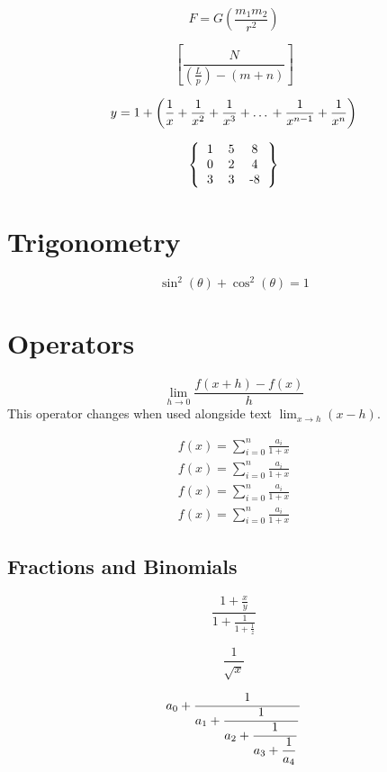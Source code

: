\documentclass[]{article}
\begin{document}
\[ 
F = G \left( \frac{m_1 m_2}{r^2} \right)
\]

\[ 
\left[  \frac{ N } { \left( \frac{L}{p} \right)  - (m+n) }  \right]
\]


\begin{equation*}
	y = 1 + \left(  \frac{1}{x} + \frac{1}{x^2} + \frac{1}{x^3} +  \ldots  \\
             + \frac{1}{x^{n-1}} + \frac{1}{x^n} \right)
\end{equation*}


\[ 
\left \{
\begin{tabular}{ccc}
	1 & 5 & 8 \\
	0 & 2 & 4 \\
	3 & 3 & -8 
\end{tabular}
\right \}
\]

\newpage

\section{Trigonometry}

\[
\sin^2(\theta)+\cos^2(\theta) = 1
\]

\section{Operators}

	\[
\lim_{h \rightarrow 0 } \frac{f(x+h)-f(x)}{h}
\]
This operator changes when used alongside 
text \quad  \( \lim_{x \rightarrow h} (x-h) \).


\begin{eqnarray*}
	f(x) = \sum_{i=0}^{n} \frac{a_i}{1+x} \\
	\textstyle f(x) = \textstyle \sum_{i=0}^{n} \frac{a_i}{1+x} \\
	\scriptstyle f(x) = \scriptstyle \sum_{i=0}^{n} \frac{a_i}{1+x} \\
	\scriptscriptstyle f(x) = \scriptscriptstyle \sum_{i=0}^{n} \frac{a_i}{1+x}
\end{eqnarray*}


\subsection{Fractions and Binomials}

\[ \frac{1+\frac{x}{y}}{1+\frac{1}{1+\frac{1}{z}}} \]

\[ \frac{1}{\sqrt{x}} \]

\[
a_0+{1\over\displaystyle a_1+
	{1\over\displaystyle a_2+
		{1 \over\displaystyle a_3 + 
			{1 \over\displaystyle a_4}}}}
\]
\end{document}
